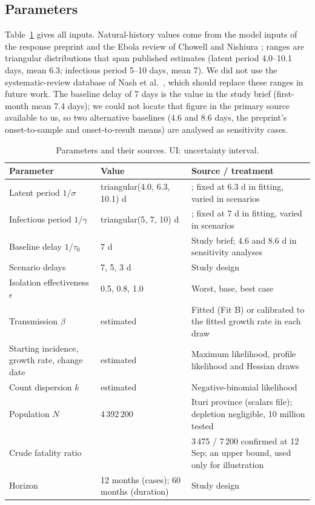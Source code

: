 \documentclass[11pt,a4paper]{article}
\begin{document}
\subsection{Parameters}
Table~\ref{tab:params} gives all inputs. Natural-history values come from the model inputs of the response preprint \citep{ebengo2026} and the Ebola review of Chowell and Nishiura \citep{chowell2014}; ranges are triangular distributions that span published estimates (latent period 4.0--10.1 days, mean 6.3; infectious period 5--10 days, mean 7). We did not use the systematic-review database of Nash et al.\ \citep{nash2024}, which should replace these ranges in future work. The baseline delay of 7 days is the value in the study brief (first-month mean 7.4 days); we could not locate that figure in the primary source available to us, so two alternative baselines (4.6 and 8.6 days, the preprint's onset-to-sample and onset-to-result means) are analysed as sensitivity cases.

\begin{table}[H]\centering\small
\caption{Parameters and their sources. UI: uncertainty interval.}\label{tab:params}
\begin{tabular}{@{}p{4.1cm}p{3.6cm}p{6.6cm}@{}}\toprule
Parameter & Value & Source / treatment \\\midrule
Latent period $1/\sigma$ & triangular(4.0, 6.3, 10.1) d & \citep{ebengo2026,chowell2014}; fixed at 6.3 d in fitting, varied in scenarios \\
Infectious period $1/\gamma$ & triangular(5, 7, 10) d & \citep{ebengo2026,chowell2014}; fixed at 7 d in fitting, varied in scenarios \\
Baseline delay $1/\tau_0$ & 7 d & Study brief; 4.6 and 8.6 d in sensitivity analyses \\
Scenario delays & 7, 5, 3 d & Study design \\
Isolation effectiveness $\epsilon$ & 0.5, 0.8, 1.0 & Worst, base, best case \\
Transmission $\beta$ & estimated & Fitted (Fit B) or calibrated to the fitted growth rate in each draw \\
Starting incidence, growth rate, change date & estimated & Maximum likelihood, profile likelihood and Hessian draws \\
Count dispersion $k$ & estimated & Negative-binomial likelihood \\
Population $N$ & 4\,392\,200 & Ituri province (scalars file); depletion negligible, 10 million tested \\
Crude fatality ratio & \cfrAssumed{} & 3\,475 / 7\,200 confirmed at 12 Sep; an upper bound, used only for illustration \\
Horizon & 12 months (cases); 60 months (duration) & Study design \\\bottomrule
\end{tabular}\end{table}
\end{document}

